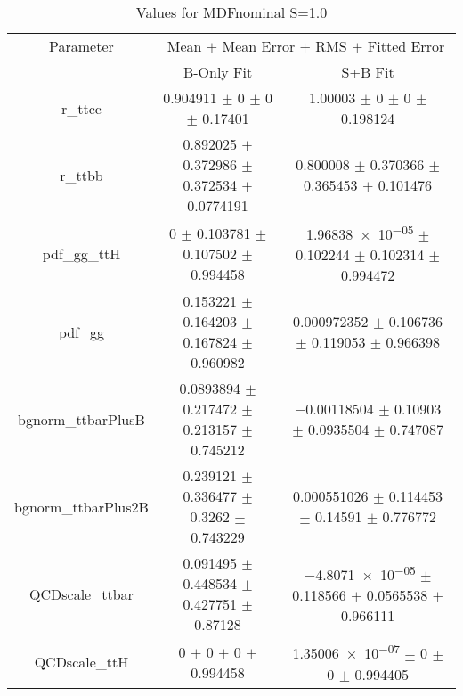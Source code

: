 \begin{table}
\centering
\caption{Values for MDFnominal S=1.0}
\begin{tabular}{ccc}
\toprule
Parameter & \multicolumn{2}{c}{Mean $\pm$ Mean Error $\pm$ RMS $\pm$ Fitted Error}\\
 & B-Only Fit & S+B Fit\\
\midrule
r\_ttcc & \num{0.904911} $\pm$ \num{0} $\pm$ \num{0} $\pm$ \num{0.17401} & \num{1.00003} $\pm$ \num{0} $\pm$ \num{0} $\pm$ \num{0.198124}\\
r\_ttbb & \num{0.892025} $\pm$ \num{0.372986} $\pm$ \num{0.372534} $\pm$ \num{0.0774191} & \num{0.800008} $\pm$ \num{0.370366} $\pm$ \num{0.365453} $\pm$ \num{0.101476}\\
pdf\_gg\_ttH & \num{0} $\pm$ \num{0.103781} $\pm$ \num{0.107502} $\pm$ \num{0.994458} & \num{1.96838e-05} $\pm$ \num{0.102244} $\pm$ \num{0.102314} $\pm$ \num{0.994472}\\
pdf\_gg & \num{0.153221} $\pm$ \num{0.164203} $\pm$ \num{0.167824} $\pm$ \num{0.960982} & \num{0.000972352} $\pm$ \num{0.106736} $\pm$ \num{0.119053} $\pm$ \num{0.966398}\\
bgnorm\_ttbarPlusB & \num{0.0893894} $\pm$ \num{0.217472} $\pm$ \num{0.213157} $\pm$ \num{0.745212} & \num{-0.00118504} $\pm$ \num{0.10903} $\pm$ \num{0.0935504} $\pm$ \num{0.747087}\\
bgnorm\_ttbarPlus2B & \num{0.239121} $\pm$ \num{0.336477} $\pm$ \num{0.3262} $\pm$ \num{0.743229} & \num{0.000551026} $\pm$ \num{0.114453} $\pm$ \num{0.14591} $\pm$ \num{0.776772}\\
QCDscale\_ttbar & \num{0.091495} $\pm$ \num{0.448534} $\pm$ \num{0.427751} $\pm$ \num{0.87128} & \num{-4.8071e-05} $\pm$ \num{0.118566} $\pm$ \num{0.0565538} $\pm$ \num{0.966111}\\
QCDscale\_ttH & \num{0} $\pm$ \num{0} $\pm$ \num{0} $\pm$ \num{0.994458} & \num{1.35006e-07} $\pm$ \num{0} $\pm$ \num{0} $\pm$ \num{0.994405}\\
\bottomrule
\end{tabular}
\end{table}